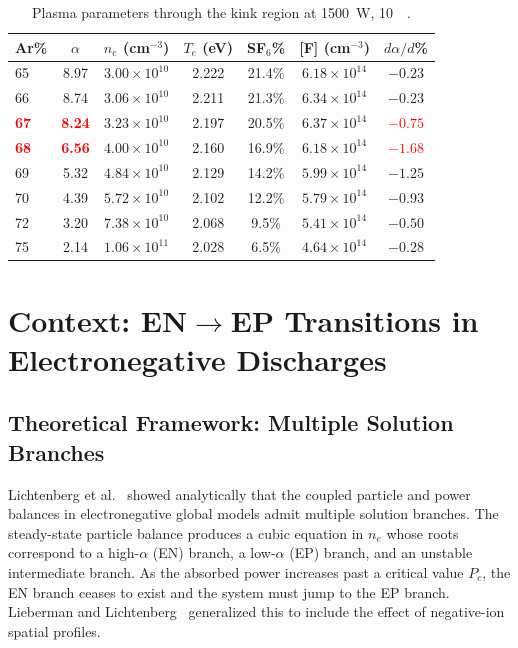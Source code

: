 \documentclass[11pt,a4paper]{report}
\newcommand{\Te}{T_e}
\begin{document}
\begin{table}[H]
\centering
\caption{Plasma parameters through the kink region at \SI{1500}{\watt}, \SI{10}{\milli\torr}.}
\label{tab:kink_params}
\begin{tabular}{lcccccc}
\toprule
\textbf{Ar\%} & $\alpha$ & $n_e$ (cm$^{-3}$) & $\Te$ (eV) & SF$_6$\% & [F] (cm$^{-3}$) & $d\alpha/d$\% \\
\midrule
65 & 8.97 & $3.00\times10^{10}$ & 2.222 & 21.4\% & $6.18\times10^{14}$ & $-0.23$ \\
66 & 8.74 & $3.06\times10^{10}$ & 2.211 & 21.3\% & $6.34\times10^{14}$ & $-0.23$ \\
\textcolor{red}{\textbf{67}} & \textcolor{red}{\textbf{8.24}} & $3.23\times10^{10}$ & 2.197 & 20.5\% & $6.37\times10^{14}$ & \textcolor{red}{\textbf{$-0.75$}} \\
\textcolor{red}{\textbf{68}} & \textcolor{red}{\textbf{6.56}} & $4.00\times10^{10}$ & 2.160 & 16.9\% & $6.18\times10^{14}$ & \textcolor{red}{\textbf{$-1.68$}} \\
69 & 5.32 & $4.84\times10^{10}$ & 2.129 & 14.2\% & $5.99\times10^{14}$ & $-1.25$ \\
70 & 4.39 & $5.72\times10^{10}$ & 2.102 & 12.2\% & $5.79\times10^{14}$ & $-0.93$ \\
72 & 3.20 & $7.38\times10^{10}$ & 2.068 & 9.5\% & $5.41\times10^{14}$ & $-0.50$ \\
75 & 2.14 & $1.06\times10^{11}$ & 2.028 & 6.5\% & $4.64\times10^{14}$ & $-0.28$ \\
\bottomrule
\end{tabular}
\end{table}

\section{Context: EN$\to$EP Transitions in Electronegative Discharges}
\label{sec:kink_context}

\subsection{Theoretical Framework: Multiple Solution Branches}
\label{sec:kink_theory}

Lichtenberg et al.~\cite{Lichtenberg1997} showed analytically that the coupled particle and power balances in electronegative global models admit multiple solution branches.  The steady-state particle balance produces a cubic equation in $n_e$ whose roots correspond to a high-$\alpha$ (EN) branch, a low-$\alpha$ (EP) branch, and an unstable intermediate branch.  As the absorbed power increases past a critical value $P_c$, the EN branch ceases to exist and the system must jump to the EP branch.  Lieberman and Lichtenberg~\cite{Lieberman2005} generalized this to include the effect of negative-ion spatial profiles.
\end{document}

